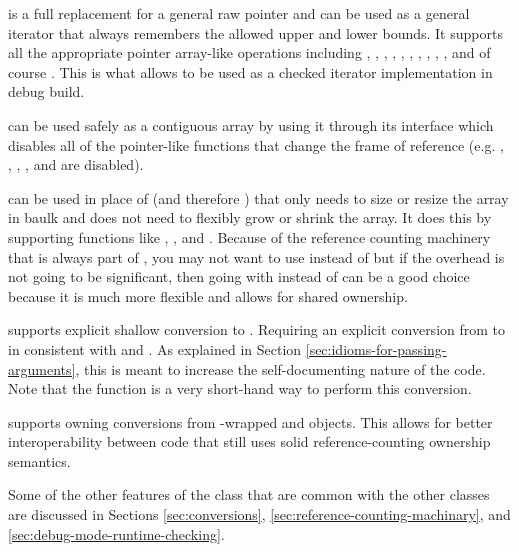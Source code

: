 \documentclass[pdf,ps2pdf,11pt]{SANDreport}
\begin{document}
{} is a full replacement for a general raw
pointer and can be used as a general iterator that always remembers
the allowed upper and lower bounds.  It supports all the appropriate
pointer array-like operations including {},
{}, {}, {},
{}, , {}, {},
{}, {}, and of course
{}.  This is what allows {} to be used
as a checked iterator implementation in debug build.

{} can be used safely as a contiguous array by
using it through its {} interface which disables all of
the pointer-like functions that change the frame of reference
(e.g. {}, {}, , {}, and
{} are disabled).

{} can be used in place of
{} (and therefore {}) that only
needs to size or resize the array in baulk and does not need to
flexibly grow or shrink the array.  It does this by supporting
functions like {}, {}, and
{}.  Because of the reference counting machinery that
is always part of {}, you may not want to use
{} instead of {} but if the overhead is
not going to be significant, then going with {}
instead of {} can be a good choice because it is much
more flexible and allows for shared ownership.

{} supports explicit shallow conversion to
{}.  Requiring an explicit conversion from
{} to {} in consistent with
{} and {}.  As explained in Section
{}\ref{sec:idioms-for-passing-arguments}, this is meant to increase
the self-documenting nature of the code.  Note that the
{} function is a very short-hand way to
perform this conversion.

{} supports owning conversions from
{}-wrapped {} and {}
objects.  This allows for better interoperability between code that
still uses solid reference-counting ownership semantics.

Some of the other features of the {} class that are
common with the other classes are discussed in Sections
{}\ref{sec:conversions}, {}\ref{sec:reference-counting-machinary}, and
{}\ref{sec:debug-mode-runtime-checking}.
\end{document}
